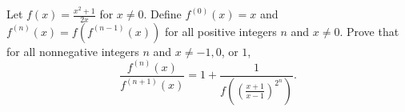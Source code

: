 Let $f(x) = \frac{x^2 + 1}{2x}$ for $x \neq 0$. Define $f^{(0)}(x) = x$ and $f^{(n)}(x) = f(f^{(n-1)}(x))$ for all positive integers $n$ and $x \neq 0$. Prove that for all nonnegative integers $n$ and $x \neq -1, 0$, or $1$,
\[
\frac{f^{(n)}(x)}{f^{(n+1)}(x)} = 1 + \frac{1}{f\left(\left(\frac{x+1}{x-1}\right)^{2^n}\right)}.
\]

